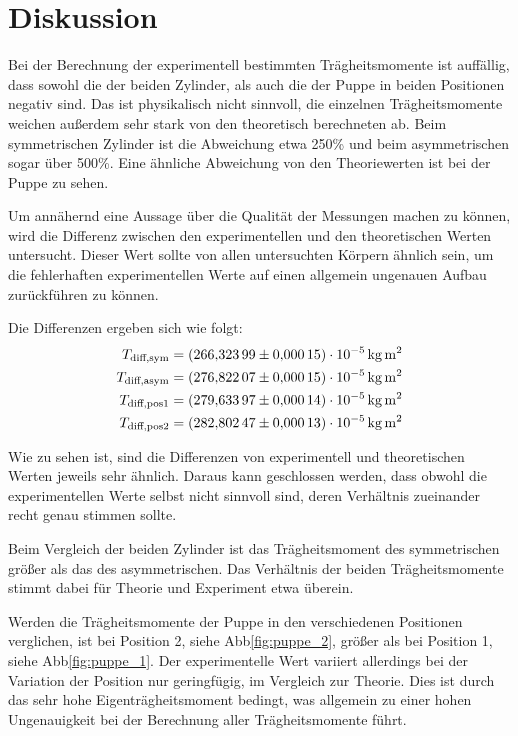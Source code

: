 \section{Diskussion}
\label{sec:Diskussion}



Bei der Berechnung der experimentell bestimmten Trägheitsmomente ist auffällig, dass sowohl die der beiden Zylinder, als auch die 
der Puppe in beiden Positionen negativ sind. Das ist physikalisch nicht sinnvoll, die einzelnen 
Trägheitsmomente weichen außerdem sehr stark von den theoretisch berechneten ab. Beim symmetrischen Zylinder ist die Abweichung etwa
250\% und beim asymmetrischen sogar über 500\%. Eine ähnliche Abweichung von den Theoriewerten ist bei der Puppe zu sehen.

Um annähernd eine Aussage über die Qualität der Messungen machen zu können, wird die Differenz zwischen den experimentellen 
und den theoretischen Werten untersucht.
Dieser Wert sollte von allen untersuchten Körpern ähnlich sein, um 
die fehlerhaften experimentellen Werte auf einen allgemein ungenauen Aufbau zurückführen zu können.

Die Differenzen ergeben sich wie folgt:
\begin{align}
T_\text{diff,sym}& = \SI{266.32399 (00015)e-5}{\kilo\gram\square\m} \\
T_\text{diff,asym}& = \SI{276.82207 (00015)e-5}{\kilo\gram\square\m} \\
T_\text{diff,pos1}& = \SI{279.63397 (00014)e-5}{\kilo\gram\square\m} \\
T_\text{diff,pos2}& = \SI{282.80247 (00013)e-5}{\kilo\gram\square\m}
\end{align}

Wie zu sehen ist, sind die Differenzen von experimentell und theoretischen Werten jeweils sehr ähnlich.
Daraus kann geschlossen werden, dass obwohl die experimentellen Werte selbst nicht sinnvoll sind, deren Verhältnis zueinander recht 
genau stimmen sollte. 

Beim Vergleich der beiden Zylinder ist das Trägheitsmoment des symmetrischen größer als das des asymmetrischen. Das Verhältnis der
beiden Trägheitsmomente stimmt dabei für Theorie und Experiment etwa überein. 

Werden die Trägheitsmomente der Puppe in den verschiedenen Positionen verglichen, ist bei Position 2, siehe Abb\ref{fig:puppe_2}, 
größer als bei Position 1, siehe Abb\ref{fig:puppe_1}. Der experimentelle Wert variiert allerdings bei der Variation der Position nur
geringfügig, im Vergleich zur Theorie. Dies ist durch das sehr hohe Eigenträgheitsmoment bedingt, was allgemein zu einer hohen
Ungenauigkeit bei der Berechnung aller Trägheitsmomente führt. 


